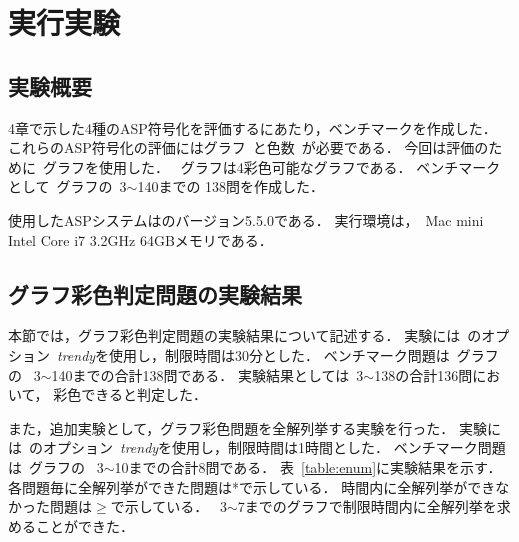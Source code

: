 \chapter{実行実験}\label{chap:experiments}

\section{実験概要}

4章で示した4種のASP符号化を評価するにあたり，ベンチマークを作成した．
これらのASP符号化の評価にはグラフ~と色数~が必要である．
今回は評価のために~グラフを使用した．
~グラフは4彩色可能なグラフである．
ベンチマークとして~グラフの~3$\sim$140までの
138問を作成した．

使用したASPシステムは{\clingo}のバージョン5.5.0である．
実行環境は，~Mac mini Intel Core i7 3.2GHz 64GBメモリである．

\section{グラフ彩色判定問題の実験結果}

本節では，グラフ彩色判定問題の実験結果について記述する．
実験には~{\clingo}のオプション~\textit{trendy}を使用し，制限時間は30分とした．
ベンチマーク問題は~グラフの
~3$\sim$140までの合計138問である．
実験結果としては~3$\sim$138の合計136問において，
彩色できると判定した．

また，追加実験として，グラフ彩色問題を全解列挙する実験を行った．
実験には~{\clingo}のオプション~\textit{trendy}を使用し，制限時間は1時間とした．
ベンチマーク問題は~グラフの
~3$\sim$10までの合計8問である．
表~\ref{table:enum}に実験結果を示す．
各問題毎に全解列挙ができた問題は*で示している．
時間内に全解列挙ができなかった問題は$\geq$で示している．
~3$\sim$7までのグラフで制限時間内に全解列挙を求めることができた．

\begin{table}[tb]
  \begin{minipage}[t]{0.45\linewidth}
    \centering
  \end{minipage}
  \begin{minipage}[t]{0.45\linewidth}
    \centering
  \end{minipage}
\end{table}

